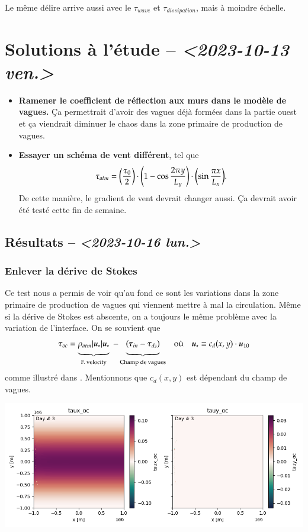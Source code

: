 \documentclass[10pt]{article}
\numberwithin{equation}{section}
\newcommand{\uu}{\vb*{u}}
\newcommand{\tall}{\vphantom{A^{x^x}_p}}
\begin{document}
Le même délire arrive aussi avec le \(\tau_{wave}\) et \(\tau_{dissipation}\), mais à moindre échelle.

\section{Solutions à l'étude -- \textit{<2023-10-13 ven.>}}
\label{sec:orge0869a6}

\begin{itemize}
\item \textbf{Ramener le coefficient de réflection aux murs dans le modèle de vagues.}
Ça permettrait d'avoir des vagues déjà formées dans la partie ouest et ça viendrait diminuer le chaos dans la zone primaire de production de vagues.
\item \textbf{Essayer un schéma de vent différent}, tel que
\begin{equation}
  \tau_{atm} = \qty(\frac{\tau_0}{2})\cdot \qty(1-\cos \frac{2\pi y}{L_y})\cdot \qty(\sin \frac{\pi x}{L_x} ).
\end{equation}
De cette manière, le gradient de vent devrait changer aussi.
Ça devrait avoir été testé cette fin de semaine.
\end{itemize}

\subsection{Résultats -- \textit{<2023-10-16 lun.>}}
\label{sec:org0351059}

\subsubsection{Enlever la dérive de Stokes}
\label{sec:org983f15a}
Ce test nous a permis de voir qu'au fond ce sont les variations dans la zone primaire de production de vagues qui viennent mettre à mal la circulation.
Même si la dérive de Stokes est abscente, on a toujours le même problème avec la variation de l'interface.
On se souvient que
\begin{align}
   && \boldsymbol{\tau}_{oc} = \underbrace{\rho_{atm} |\uu_*|\uu_*\tall}_\text{F. velocity} \ - \underbrace{\qty(\boldsymbol{\tau}_{in} - \boldsymbol{\tau}_{ds})\tall}_\text{Champ de vagues} && \text{où} && \uu_* \equiv c_d(x,y)\cdot\uu_{10} &&
\end{align}
comme illustré dans \citep{breivik_al_2015}.
Mentionnons que \(c_d(x,y)\) est dépendant du champ de vagues. 
\begin{center}
\includegraphics[width=.9\linewidth]{figures/debuggage/2023_10_16_nostokes_tauoc.png}
\end{center}
\end{document}
